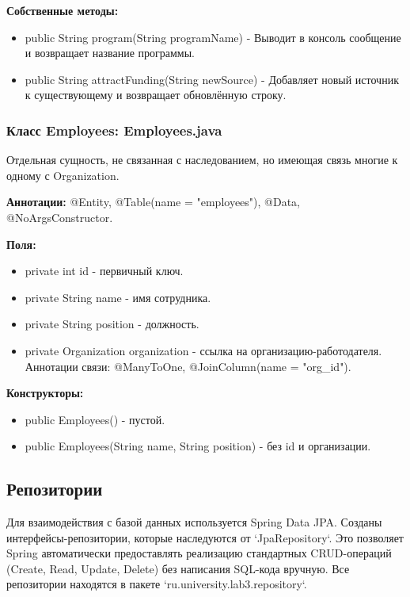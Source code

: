 \documentclass[oneside,a4paper,14pt]{extarticle}
\begin{document}
\textbf{Собственные методы:}
\begin{itemize}
    \item public String program(String programName) - Выводит в консоль сообщение и возвращает название программы.
    \item public String attractFunding(String newSource) - Добавляет новый источник к существующему и возвращает обновлённую строку.
\end{itemize}

\subsubsection*{Класс Employees: Employees.java}

Отдельная сущность, не связанная с наследованием, но имеющая связь многие к одному с Organization.

\textbf{Аннотации:} @Entity, @Table(name = "employees"), @Data, @NoArgsConstructor.

\textbf{Поля:}
\begin{itemize}
    \item private int id - первичный ключ.
    \item private String name - имя сотрудника.
    \item private String position - должность.
    \item private Organization organization - ссылка на организацию-работодателя. Аннотации связи: @ManyToOne, @JoinColumn(name = "org\_id").
\end{itemize}

\textbf{Конструкторы:}
\begin{itemize}
    \item public Employees() - пустой.
    \item public Employees(String name, String position) - без id и организации.
\end{itemize}

\newpage

\subsection*{Репозитории}

Для взаимодействия с базой данных используется Spring Data JPA. Созданы интерфейсы-репозитории, которые наследуются от `JpaRepository`. Это позволяет Spring автоматически предоставлять реализацию стандартных CRUD-операций (Create, Read, Update, Delete) без написания SQL-кода вручную. Все репозитории находятся в пакете `ru.university.lab3.repository`.
\end{document}
